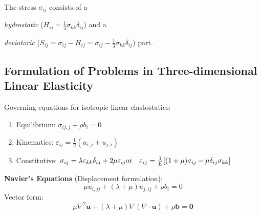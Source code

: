 \documentclass[10pt,twocolumn, a4paper]{article}
\begin{document}
The stress $\sigma_{ij}$ consists of a 
\textit{hydrostatic} ($H_{ij} = \frac{1}{3} \sigma_{kk} \delta_{ij}$) and a
\textit{deviatoric} ($S_{ij} = \sigma_{ij} - H_{ij} = \sigma_{ij} - \frac{1}{3} \sigma_{kk} \delta_{ij}$) part. 

\subsection{Formulation of Problems in Three-dimensional Linear Elasticity}
Governing equations for isotropic linear elastostatics:
\begin{enumerate}
    \item Equilibrium: $\sigma_{ij,j} + \rho b_i = 0$
    \item Kinematics: $\varepsilon_{ij} = \frac{1}{2}(u_{i,j} + u_{j,i})$
    \item Constitutive: $\sigma_{ij} = \lambda \varepsilon_{kk} \delta_{ij} + 2\mu \varepsilon_{ij} \\\text{or}\quad \varepsilon_{ij} = \frac{1}{E} [(1+\mu)\sigma_{ij} - \mu \delta_{ij} \sigma_{kk}]$
\end{enumerate}
\textbf{Navier's Equations} (Displacement formulation):
\[ \mu u_{i,jj} + (\lambda + \mu) u_{j,ij} + \rho b_i = 0 \]
Vector form:
\[ \mu \nabla^2 \bm{u} + (\lambda + \mu) \nabla (\nabla \cdot \bm{u}) + \rho \bm{b} = \bm{0} \]
\end{document}

